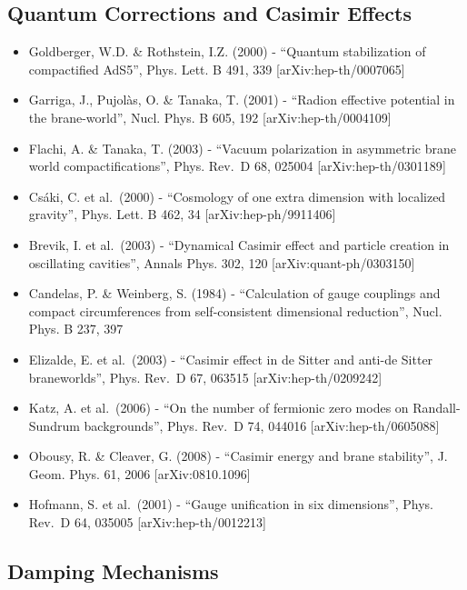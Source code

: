 \documentclass[
  11pt,
]{report}
\providecommand{\tightlist}{%
  \setlength{\itemsep}{0pt}\setlength{\parskip}{0pt}}
\begin{document}
\subsection{Quantum Corrections and Casimir
Effects}\label{quantum-corrections-and-casimir-effects}

\begin{itemize}
\tightlist
\item
  Goldberger, W.D. \& Rothstein, I.Z. (2000) - ``Quantum stabilization
  of compactified AdS5'', Phys. Lett. B 491, 339
  {[}arXiv:hep-th/0007065{]}
\item
  Garriga, J., Pujolàs, O. \& Tanaka, T. (2001) - ``Radion effective
  potential in the brane-world'', Nucl. Phys. B 605, 192
  {[}arXiv:hep-th/0004109{]}
\item
  Flachi, A. \& Tanaka, T. (2003) - ``Vacuum polarization in asymmetric
  brane world compactifications'', Phys. Rev.~D 68, 025004
  {[}arXiv:hep-th/0301189{]}
\item
  Csáki, C. et al.~(2000) - ``Cosmology of one extra dimension with
  localized gravity'', Phys. Lett. B 462, 34 {[}arXiv:hep-ph/9911406{]}
\item
  Brevik, I. et al.~(2003) - ``Dynamical Casimir effect and particle
  creation in oscillating cavities'', Annals Phys. 302, 120
  {[}arXiv:quant-ph/0303150{]}
\item
  Candelas, P. \& Weinberg, S. (1984) - ``Calculation of gauge couplings
  and compact circumferences from self-consistent dimensional
  reduction'', Nucl. Phys. B 237, 397
\item
  Elizalde, E. et al.~(2003) - ``Casimir effect in de Sitter and anti-de
  Sitter braneworlds'', Phys. Rev.~D 67, 063515
  {[}arXiv:hep-th/0209242{]}
\item
  Katz, A. et al.~(2006) - ``On the number of fermionic zero modes on
  Randall-Sundrum backgrounds'', Phys. Rev.~D 74, 044016
  {[}arXiv:hep-th/0605088{]}
\item
  Obousy, R. \& Cleaver, G. (2008) - ``Casimir energy and brane
  stability'', J. Geom. Phys. 61, 2006 {[}arXiv:0810.1096{]}
\item
  Hofmann, S. et al.~(2001) - ``Gauge unification in six dimensions'',
  Phys. Rev.~D 64, 035005 {[}arXiv:hep-th/0012213{]}
\end{itemize}

\subsection{Damping Mechanisms}\label{damping-mechanisms}
\end{document}
